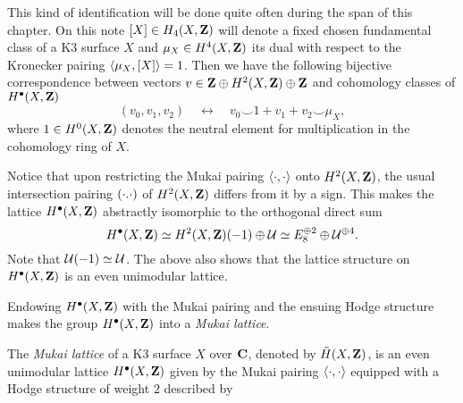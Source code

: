 \begin{remark}
    This kind of identification will be done quite often during the span of this chapter. On this note $[X] \in H_4(X, \mathbf Z)$ will denote a fixed chosen fundamental class of a K3 surface $X$ and $\mu_X \in H^{4}(X, \mathbf Z)$ its dual with respect to the Kronecker pairing $\langle \mu_X, [X] \rangle = 1$. Then we have the following bijective correspondence between vectors $v \in \mathbf Z \oplus H^{2}(X, \mathbf Z) \oplus \mathbf Z$ and cohomology classes of $H^{\bullet}(X, \mathbf Z)$
    \[
        (v_0, v_1, v_2) \quad \leftrightarrow \quad v_0 \smallsmile 1 + v_1 + v_2 \smallsmile \mu_X,
    \]
    where $1 \in H^{0}(X, \mathbf Z)$ denotes the neutral element for multiplication in the cohomology ring of $X$. 
\end{remark}




\begin{remark}
    \label{Mukai lattice structure}
    Notice that upon restricting the Mukai pairing $\langle \cdot, \cdot \rangle$ onto $H^{2}(X, \mathbf Z)$, the usual intersection pairing $(\cdot.\cdot)$ of $H^{2}(X, \mathbf Z)$ differs from it by a sign. This makes the lattice $H^{\bullet}(X, \mathbf Z)$ abstractly isomorphic to the orthogonal direct sum
    \[
        H^{\bullet}(X, \mathbf Z) \simeq H^{2}(X, \mathbf Z)(-1) \oplus \mathcal U \simeq E_8^{\oplus 2} \oplus \mathcal U^{\oplus 4}.
    \]
    Note that $\mathcal U(-1) \simeq \mathcal U$. The above also shows that the lattice structure on $H^{\bullet}(X, \mathbf Z)$ is an even unimodular lattice.
\end{remark}

Endowing $H^{\bullet}(X, \mathbf Z)$ with the Mukai pairing and the ensuing Hodge structure makes the group $H^{\bullet}(X, \mathbf Z)$ into a \emph{Mukai lattice}.

\begin{definition}
    The \emph{Mukai lattice} of a K3 surface $X$ over $\mathbf C$, denoted by $\,\tilde{\!{H}}(X, \mathbf Z)$, is an even unimodular lattice $H^{\bullet}(X, \mathbf Z)$ given by the Mukai pairing $\langle \cdot, \cdot \rangle$ equipped with a Hodge structure of weight $2$ described by 
\end{definition}

